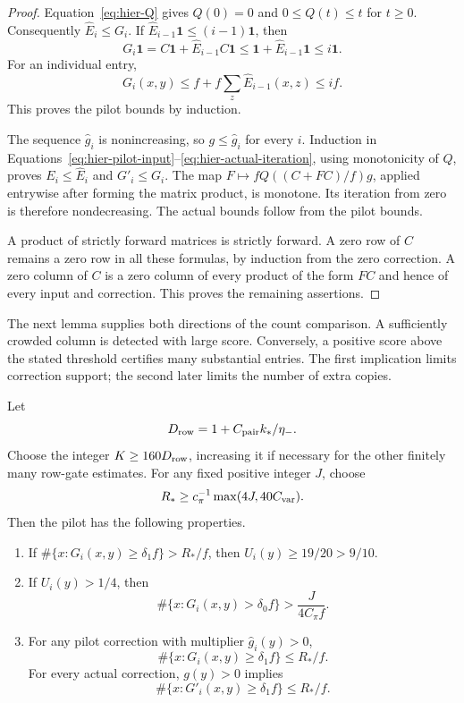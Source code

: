 \begin{proof}
Equation~\eqref{eq:hier-Q} gives $Q(0)=0$ and
$0\leq Q(t)\leq t$ for $t\ge0$.
Consequently $\widehat E_i\leq G_i$.  If
$\widehat E_{i-1}\mathbf 1\leq(i-1)\mathbf 1$, then
\[
 G_i\mathbf 1=C\mathbf 1+\widehat E_{i-1}C\mathbf 1
       \leq\mathbf 1+\widehat E_{i-1}\mathbf 1
       \leq i\mathbf 1.
\]
For an individual entry,
\[
 G_i(x,y)\leq f+f\sum_z\widehat E_{i-1}(x,z)\leq if.
\]
This proves the pilot bounds by induction.

The sequence $\widehat g_i$ is nonincreasing, so
$g\leq\widehat g_i$ for every $i$.  Induction in
Equations~\eqref{eq:hier-pilot-input}--\eqref{eq:hier-actual-iteration},
using monotonicity of $Q$, proves $E_i\leq\widehat E_i$ and
$G'_i\leq G_i$.  The map
$F\mapsto fQ((C+FC)/f)g$, applied entrywise after forming the matrix
product, is monotone.  Its iteration from zero is therefore
nondecreasing.  The actual bounds follow from the pilot bounds.

A product of strictly forward matrices is strictly forward.  A zero row
of $C$ remains a zero row in all these formulas, by induction from the
zero correction.  A zero column of $C$ is a zero column of every product
of the form $FC$ and hence of every input and correction.  This proves
the remaining assertions.
\end{proof}

The next lemma supplies both directions of the count comparison. A sufficiently crowded column is detected with large score. Conversely, a positive score above the stated threshold certifies many substantial entries. The first implication limits correction support; the second later limits the number of extra copies.

\begin{lemma}
\label{lem:hier-column-test}
Let
\[
 D_{\rm row}=1+C_{\rm pair}k_*/\eta_-.
\]
Choose the integer $K\geq160D_{\rm row}$, increasing it if necessary
for the other finitely many row-gate estimates.  For any fixed positive
integer $J$, choose
\begin{equation}
 R_*\geq c_\pi^{-1}\max(4J,40C_{\rm var}).
 \label{eq:hier-column-constants}
\end{equation}
Then the pilot has the following properties.
\begin{enumerate}
\item If
$\#\{x:G_i(x,y)\geq\delta_1f\}>R_*/f$, then
$U_i(y)\geq19/20>9/10$.
\item If $U_i(y)>1/4$, then
\[
 \#\{x:G_i(x,y)>\delta_0f\}
       >\frac{J}{4C_\pi f}.
\]
\item For any pilot correction with multiplier
$\widehat g_i(y)>0$,
\[
 \#\{x:G_i(x,y)\geq\delta_1f\}\leq R_*/f.
\]
For every actual correction, $g(y)>0$ implies
\[
 \#\{x:G'_i(x,y)\geq\delta_1f\}\leq R_*/f.
\]
\end{enumerate}
\end{lemma}

